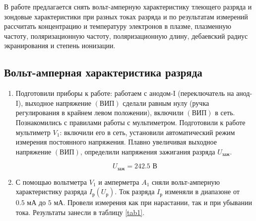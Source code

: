 \documentclass[a4paper,12pt]{article} %
\begin{document}
В работе предлагается снять вольт-амперную характеристику тлеющего разряда и зондовые характеристики при разных токах разряда и по результатам измерений рассчитать концентрацию и температуру электронов в плазме, плазменную частоту, поляризационную частоту, поляризационную длину, дебаевский радиус экранирования и степень ионизации.

\subsection{Вольт-амперная характеристика разряда}

\begin{enumerate}
    \item Подготовили приборы к работе: работаем с анодом-I (переключатель на анод-I), выходное напряжение $(\text{ВИП})$ сделали равным нулу (ручка регулирования в крайнем левом положении), включили $(\text{ВИП})$ в сеть. 
    Познакомились с правилами работы с мультиметром.
    Подготовили к работе мультиметр $V_1$: включили его в сеть, установили автоматический режим измерения постоянного напряжения.
    Плавно увеличивая выходное напряжение $(\text{ВИП})$, определили напряжения зажигания разряда $U_{\text{заж}}$.

    \[ U_{\text{заж}} = 242.5 \text{ В} \]

    \item С помощью вольтметра $V_1$ и амперметра $A_1$ сняли вольт-амперную характеристику разряда $I_{\text{р}}(U_{\text{р}})$. Ток разряда $I_{\text{р}}$ изменяли в диапазоне от $0.5 \text{ мА}$ до $5 \text{ мА}$. Провели измерения как при нарастании, так и при убывании тока. Результаты занесли в таблицу \ref{tab1}.


\end{enumerate}
\end{document}

